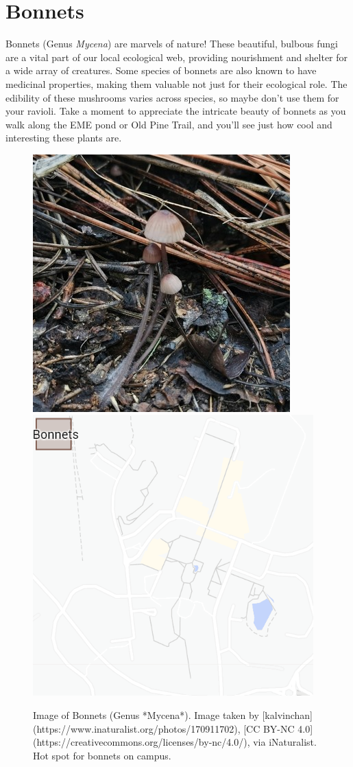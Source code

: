 \documentclass[
]{book}
\begin{document}
\hypertarget{bonnets}{%
\section{Bonnets}\label{bonnets}}

Bonnets (Genus \emph{Mycena}) are marvels of nature! These beautiful, bulbous fungi are a vital part of our local ecological web, providing nourishment and shelter for a wide array of creatures. Some species of bonnets are also known to have medicinal properties, making them valuable not just for their ecological role. The edibility of these mushrooms varies across species, so maybe don't use them for your ravioli. Take a moment to appreciate the intricate beauty of bonnets as you walk along the EME pond or Old Pine Trail, and you'll see just how cool and interesting these plants are.

\begin{figure}

{\centering \includegraphics[width=0.49\linewidth,height=0.2\textheight]{plant_images/bonnets_11} \includegraphics[width=0.49\linewidth,height=0.2\textheight]{plant_images/bonnets_hotspot_11} 

}

\caption{Image of Bonnets (Genus *Mycena*). Image taken by [kalvinchan](https://www.inaturalist.org/photos/170911702), [CC BY-NC 4.0](https://creativecommons.org/licenses/by-nc/4.0/), via iNaturalist. Hot spot for bonnets on campus.}\label{fig:unnamed-chunk-12}
\end{figure}
\end{document}
